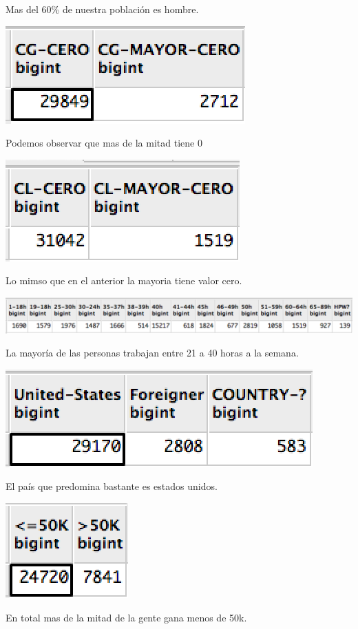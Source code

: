 \documentclass{article}
\begin{document}
  Mas del 60\% de nuestra población es hombre.
  \begin{center}
    \includegraphics{tablas/capitalgain}
  \end{center}
  Podemos observar que mas de la mitad tiene 0
  \begin{center}
    \includegraphics{tablas/capitalloss}
  \end{center}
  Lo mimso que en el anterior la mayoria tiene valor cero.
  \begin{center}
    \includegraphics[scale=0.5]{tablas/hpw}
  \end{center}
  La mayoría de las personas trabajan entre 21 a 40 horas a la semana.
  \begin{center}
    \includegraphics{tablas/nativecountry}
  \end{center}
  El país que predomina bastante es estados unidos.
  \begin{center}
    \includegraphics{tablas/total}
  \end{center}
  En total mas de la mitad de la gente gana menos de 50k.
\end{document}
